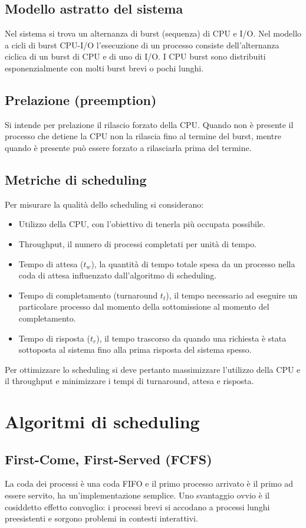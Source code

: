 \subsection{Modello astratto del sistema}
Nel sistema si trova un alternanza di burst (sequenza) di CPU e I/O. Nel modello a cicli di burst CPU-I/O l'esecuzione di un processo  consiste dell'alternanza ciclica di un burst di CPU
e di uno di I/O. I CPU burst sono distribuiti esponenzialmente con molti burst brevi o pochi lunghi. 
\subsection{Prelazione (preemption)}
Si intende per prelazione il rilascio forzato della CPU. Quando non \`e presente il processo che detiene la CPU non la rilascia fino al termine del burst, mentre quando \`e presente 
pu\`o essere forzato a rilasciarla prima del termine. 
\subsection{Metriche di scheduling}
Per misurare la qualit\`a dello scheduling si considerano:
\begin{itemize}
	\item Utilizzo della CPU, con l'obiettivo di tenerla pi\`u occupata possibile.
	\item Throughput, il numero di processi completati per unit\`a di tempo.
	\item Tempo di attesa ($t_w$), la quantit\`a di tempo totale spesa da un processo nella coda di attesa influenzato dall'algoritmo di scheduling.
	\item Tempo di completamento (turnaround $t_t$), il tempo necessario ad eseguire un particolare processo dal momento della sottomissione al momento del completamento.
	\item Tempo di risposta ($t_r$), il tempo trascorso da quando una richiesta \`e stata sottoposta al sistema fino alla prima risposta del sistema spesso.
\end{itemize}
Per ottimizzare lo scheduling si deve pertanto massimizzare l'utilizzo della CPU e il throughput e minimizzare i tempi di turnaround, attesa e risposta.
\section{Algoritmi di scheduling}
\subsection{First-Come, First-Served (FCFS)}
La coda dei processi \`e una coda FIFO e il primo processo arrivato \`e il primo ad essere servito, ha un'implementazione semplice. Uno svantaggio ovvio \`e il cosiddetto effetto
convoglio: i processi brevi si accodano a processi lunghi preesistenti e sorgono problemi in contesti interattivi. 
